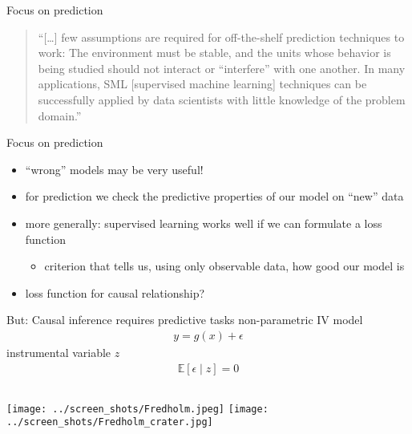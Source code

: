 \documentclass[xcolor=dvipsnames, handout]{beamer}
\newcommand{\E}{\mathbb{E}}
\begin{document}
\begin{frame}{Focus on prediction}
\begin{quote}
``[\dots] few assumptions are required for off-the-shelf prediction techniques to work: The environment must be stable, and the units whose behavior is being studied should not interact or ``interfere'' with one another. In many applications, SML [supervised machine learning] techniques can be successfully applied by data scientists with little knowledge of the problem domain.'' \parencite{athey2017beyond}
\end{quote}
\end{frame}

\begin{frame}{Focus on prediction}
\begin{itemize}
  \item ``wrong'' models may be very useful!
  \pause\item for prediction we check the predictive properties of our model on ``new'' data
  \pause\item more generally: supervised learning works well if we can formulate a loss function
  \begin{itemize}
    \item criterion that tells us, using only observable data, how good our model is
  \end{itemize}
  \item loss function for causal relationship?
\end{itemize}
\end{frame}

\begin{frame}{But: Causal inference requires predictive tasks}
non-parametric IV model \parencite{newey2003instrumental}
\begin{align*}
  y = g(x) + \epsilon
\end{align*}
instrumental variable $z$ 
\begin{align*}
  \E[\epsilon \mid z] = 0
\end{align*}
\end{frame}


\begin{frame}
\begin{columns}[t, onlytextwidth]
    \texttt{[image: ../screen\_shots/Fredholm.jpeg]}
    \texttt{[image: ../screen\_shots/Fredholm\_crater.jpg]}
\end{columns}
\end{frame}
\end{document}
